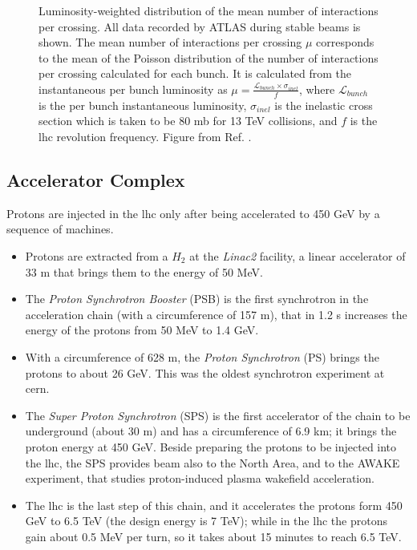 \begin{figure}[ht]
\centering
{}
\caption{Luminosity-weighted distribution of the mean number of interactions per crossing. All data recorded by ATLAS during stable beams is shown. The mean number of interactions per crossing $\mu$ corresponds to the mean of the Poisson distribution of the number of interactions per crossing calculated for each bunch. It is calculated from the instantaneous per bunch luminosity as 
$\mu = \frac{\mathcal{L}_{bunch}\times \sigma_{inel}}{f}$, where $\mathcal{L}_{bunch}$ is the per bunch instantaneous luminosity, $\sigma_{inel}$ is the inelastic cross section which is taken to be 80 mb for 13 TeV collisions, and $f$ is the \gls{lhc} revolution frequency. Figure from Ref. \cite{LumiTwiki}.}
\label{fig:atlas:pu}
\end{figure}


\subsection{Accelerator Complex}

Protons are injected in the \gls{lhc} only after being accelerated to 450 GeV by a sequence of machines.

\begin{itemize}
\item Protons are extracted from a $H_2$ at the \textit{Linac2} facility, a linear accelerator of 33 m that brings them to the energy of 50 MeV.
\item The \textit{Proton Synchrotron Booster} (PSB) is the first synchrotron in the acceleration chain (with a circumference of 157 m), that in 1.2 s increases the energy of the protons from 50 MeV to 1.4 GeV.
\item With a circumference of 628 m, the \textit{Proton Synchrotron} (PS) brings the protons to about 26 GeV. This was the oldest synchrotron experiment at \gls{cern}.
\item The \textit{Super Proton Synchrotron} (SPS) is the first accelerator of the chain to be underground (about 30 m) and has a circumference of 6.9 km; it brings the proton energy at 450 GeV. Beside preparing the protons to be injected into the \gls{lhc}, the SPS provides beam also to the North Area, and to the AWAKE experiment, that studies proton-induced plasma wakefield acceleration.
\item The \gls{lhc} is the last step of this chain, and it accelerates the protons form 450 GeV to 6.5 TeV (the design energy is 7 TeV); while in the \gls{lhc} the protons gain about 0.5 MeV per turn, so it takes about 15 minutes to reach 6.5 TeV.
\end{itemize}

